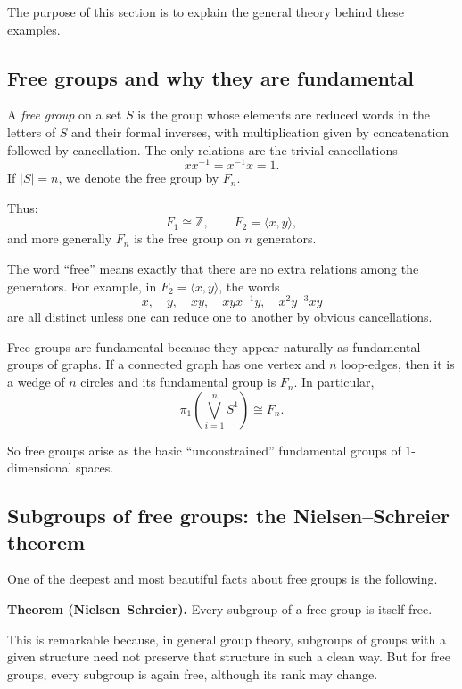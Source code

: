 \documentclass[12pt,a4paper]{article}
\theoremstyle{notespace}
\begin{document}
The purpose of this section is to explain the general theory behind these examples.

\subsection{Free groups and why they are fundamental}

A \emph{free group} on a set \(S\) is the group whose elements are reduced words in the letters of \(S\) and their formal inverses, with multiplication given by concatenation followed by cancellation. The only relations are the trivial cancellations
\[
xx^{-1}=x^{-1}x=1.
\]
If \(|S|=n\), we denote the free group by \(F_n\).

Thus:
\[
F_1\cong \mathbb Z,
\qquad
F_2=\langle x,y\rangle,
\]
and more generally \(F_n\) is the free group on \(n\) generators.

The word ``free'' means exactly that there are no extra relations among the generators. For example, in \(F_2=\langle x,y\rangle\), the words
\[
x,\quad y,\quad xy,\quad xyx^{-1}y,\quad x^2y^{-3}xy
\]
are all distinct unless one can reduce one to another by obvious cancellations.

Free groups are fundamental because they appear naturally as fundamental groups of graphs. If a connected graph has one vertex and \(n\) loop-edges, then it is a wedge of \(n\) circles and its fundamental group is \(F_n\). In particular,
\[
\pi_1\!\left(\bigvee_{i=1}^n S^1\right)\cong F_n.
\]

So free groups arise as the basic ``unconstrained'' fundamental groups of \(1\)-dimensional spaces.

\subsection{Subgroups of free groups: the Nielsen--Schreier theorem}

One of the deepest and most beautiful facts about free groups is the following.

\medskip

\textbf{Theorem (Nielsen--Schreier).}
Every subgroup of a free group is itself free.

\medskip

This is remarkable because, in general group theory, subgroups of groups with a given structure need not preserve that structure in such a clean way. But for free groups, every subgroup is again free, although its rank may change.
\end{document}
